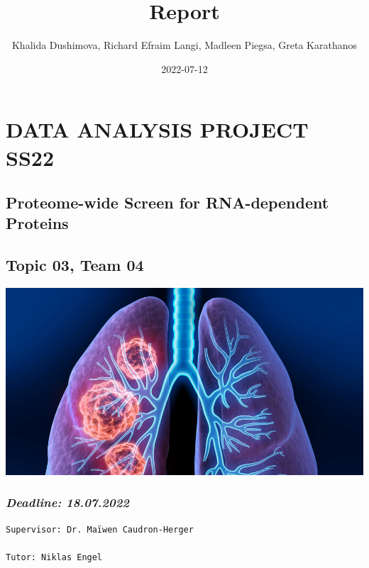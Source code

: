 \documentclass[
]{article}
\title{Report}
\author{Khalida Dushimova, Richard Efraim Langi, Madleen Piegsa, Greta
Karathanos}
\date{2022-07-12}
\begin{document}
\maketitle

\hypertarget{data-analysis-project-ss22}{%
\section{\texorpdfstring{\textbf{{DATA ANALYSIS PROJECT SS22
}}}{DATA ANALYSIS PROJECT SS22 }}\label{data-analysis-project-ss22}}

\hypertarget{proteome-wide-screen-for-rna-dependent-proteins}{%
\subsection{\texorpdfstring{\textbf{Proteome-wide Screen for
RNA-dependent
Proteins}}{Proteome-wide Screen for RNA-dependent Proteins}}\label{proteome-wide-screen-for-rna-dependent-proteins}}

\hypertarget{topic-03-team-04}{%
\subsection{\texorpdfstring{\textbf{Topic 03, Team
04}}{Topic 03, Team 04}}\label{topic-03-team-04}}

\includegraphics{../final/Lung_Cancer.png}

\hypertarget{deadline-18.07.2022}{%
\subsubsection{\texorpdfstring{\emph{Deadline:
18.07.2022}}{Deadline: 18.07.2022}}\label{deadline-18.07.2022}}

\begin{verbatim}
Supervisor: Dr. Maïwen Caudron-Herger

Tutor: Niklas Engel
\end{verbatim}
\end{document}
